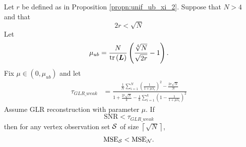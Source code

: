 {\begin{corollary}
    Let $r$ be defined as in Proposition \ref{propn:unif_ub_xi_2}. Suppose that $N > 4$ and that 
    \begin{equation}
        2r < \sqrt{N}
    \end{equation}
     Let 
    \begin{align}
        \mu_{ub} = \frac{N}{\textrm{tr}\left(\bm{L}\right)} \left( {\frac{\sqrt[4]{N}}{\sqrt{2r}}}  -1 \right). 
        \end{align}
    Fix $\mu \in (0, \mu_{ub})$ and let 
        \begin{align}
        \tau_{GLR\_weak} &= \frac{\frac{1}{N}\sum_{i=1}^{N}\left(\frac{1}{1 + \mu \lambda_{i}}\right)^{2} - \frac{2r\sqrt{N}}{N}}{1 + \frac{2r\sqrt{N}}{k} - \frac{1}{k}\sum_{i=1}^{k}\left( 1 - \frac{1}{1 + \mu \lambda_{i}}\right)^{2} }
    \end{align}
    Assume GLR reconstruction with parameter $\mu$. If
    \begin{equation}
        \textrm{SNR} < \tau_{GLR\_weak}
    \end{equation}
    then for any vertex observation set $\mathcal{S}$ of size $\left\lceil \sqrt{N}\right\rceil$,
    \begin{equation}
        \textrm{MSE}_{\mathcal{S}} < \textrm{MSE}_{\mathcal{N}}.
    \end{equation}
\end{corollary}
\fi
\fi

}
